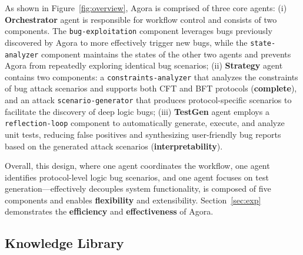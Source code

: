 \documentclass{article}
\theoremstyle{plain}
\theoremstyle{definition}
\theoremstyle{remark}
\newcommand{\consensustester}{Agora\xspace}
\newcommand{\bfagenta}{\textbf{Orchestrator}\xspace}
\newcommand{\bfagentb}{\textbf{Strategy}\xspace}
\newcommand{\bfagentc}{\textbf{TestGen}\xspace}
\begin{document}


As shown in Figure~\ref{fig:overview}, \consensustester is comprised of three core agents:
(i) \bfagenta agent is responsible for workflow control and consists of two components. The \texttt{bug-exploitation} component leverages bugs previously discovered by \consensustester to more effectively trigger new bugs, while the \texttt{state-analyzer} component maintains the states of the other two agents and prevents \consensustester from repeatedly exploring identical bug scenarios;
(ii) \bfagentb agent contains two components: a \texttt{constraints-analyzer} that analyzes the constraints of bug attack scenarios and supports both CFT and BFT protocols (\textbf{complete}), and an attack \texttt{scenario-generator} that produces protocol-specific scenarios to facilitate the discovery of deep logic bugs;
(iii) \bfagentc agent employs a \texttt{reflection-loop} component to automatically generate, execute, and analyze unit tests, reducing false positives and synthesizing user-friendly bug reports based on the generated attack scenarios  (\textbf{interpretability}).

Overall, this design, where one agent coordinates the workflow, one agent identifies protocol-level logic bug scenarios, and one agent focuses on test generation—effectively decouples system functionality, is composed of five components and enables \textbf{flexibility} and extensibility. Section~\ref{sec:exp} demonstrates the \textbf{efficiency} and \textbf{effectiveness} of \consensustester.


\subsection{Knowledge Library}
\label{sec:knowledgelibrary}


\end{document}
